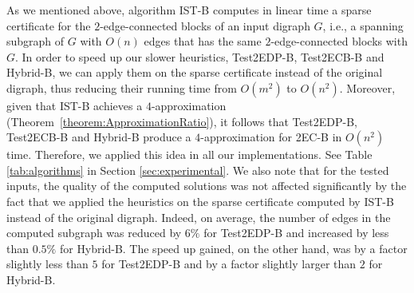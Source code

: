 \documentclass[11pt]{article}
\newcommand{\ignore}[1]{}
\newcommand{\sidenote}[1]{\textbf{(*)}\marginpar {\tiny \raggedright{(*) #1}}}
\begin{document}
As we mentioned above, algorithm \textsf{IST-B} computes in linear time a sparse certificate for the $2$-edge-connected blocks of an input digraph $G$, i.e., a spanning subgraph of $G$ with $O(n)$ edges that has the same $2$-edge-connected blocks with $G$. In order to speed up our slower heuristics, \textsf{Test2EDP-B}, \textsf{Test2ECB-B} and \textsf{Hybrid-B}, we can apply them on the sparse certificate instead of the original digraph, thus reducing their running time from $O(m^2)$ to $O(n^2)$. Moreover, given that \textsf{IST-B} achieves a $4$-approximation (Theorem~\ref{theorem:ApproximationRatio}), it follows that \textsf{Test2EDP-B}, \textsf{Test2ECB-B} and \textsf{Hybrid-B}
produce a $4$-approximation for \textsf{2EC-B} in $O(n^2)$ time. Therefore, we applied this idea in all our implementations. See Table \ref{tab:algorithms} in Section \ref{sec:experimental}.
We also note that for the tested inputs, the quality of the computed solutions was not affected significantly
by the fact that we applied the heuristics on the sparse certificate computed by \textsf{IST-B} instead of the original digraph. Indeed, on average, the number of edges in the computed subgraph
was reduced by $6\%$ for \textsf{Test2EDP-B} and increased by less than $0.5 \%$  for \textsf{Hybrid-B}. The speed up gained, on the other hand, was by a factor slightly less than $5$ for \textsf{Test2EDP-B} and by a factor slightly larger than $2$ for \textsf{Hybrid-B}.

\ignore{
Note that \textsf{Test2EDP-B}, \textsf{Test2ECB-B} and \textsf{Hybrid-B} produce the same approximation ratio with \textsf{IST-B} for \textsf{2EC-B} in $O(n^2)$ time
if they are run on the sparse subgraph computed by \textsf{IST-B} instead of the original digraph.
Given that \textsf{IST-B} achieves a 4-approximation (Theorem~\ref{theorem:ApproximationRatio}), it follows that \textsf{Test2EDP-B}, \textsf{Test2ECB-B} and \textsf{Hybrid-B}
produce a $4$-approximation for \textsf{2EC-B} in $O(n^2)$ time.
Therefore, we applied this idea in all our implementations.
See Table \ref{tab:algorithms} in Section \ref{sec:experimental}. We note that for the tested inputs, the quality of the computed solutions was not affected significantly
by the fact that we applied the heuristics on the subgraph computed by \textsf{IST-B} instead of the original graph. Indeed, on average, the number of edges in the computed subgraph
was reduced by $6\%$ for \textsf{Test2EDP-B} and increased by less than $5 \tcperthousand$  for \textsf{Hybrid-B}, while the speedup attained was by a factor close to $5$ for \textsf{Test2EDP-B} and by a factor slightly larger than $2$ for \textsf{Hybrid-B}. \sidenote{LOUKAS: Added these averages.}
}
\end{document}
